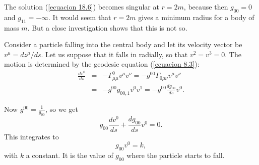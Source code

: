 The solution (\ref{ecuacion 18.6}) becomes singular at $r = 2 m$, because then $g_{00}=0$ and $g_{11}=-\infty$. It 
would seem that $r=2m$ gives a minimum radius for a body of mass $m$. But a close investigation shows that this is not 
so.

Consider a particle falling into the central body and let its velocity vector be $v^\mu = d z^\mu / ds$. Let us suppose 
that it falls in radially, so that $v^2=v^3=0$. The motion is determined by the geodesic equation (\ref{ecuacion 8.3}):
\[
 \begin{array}{rcl}
  \frac{dv^0}{ds} & = & - \Gamma^0_{\mu\mu} v^\mu v^\nu = -g^{00} \Gamma_{0\mu\nu} v^\mu v^\nu\\
         & = & -g^{00} g_{00,1} v^0 v^1 = - g^{00} \frac{dg_{00}}{ds} v^0 .
 \end{array}
\]

Now $g^{00}= \frac{1}{g_{00}}$, so we get
\[
  g_{00} \frac{dv^0}{ds} + \frac{dg_{00}}{ds} v^0 = 0.
\]
This integrates to
\[
 g_{00} v^0 = k,
\]
with $k$ a constant. It is the value of $g_{00}$ where the particle starts to fall.




